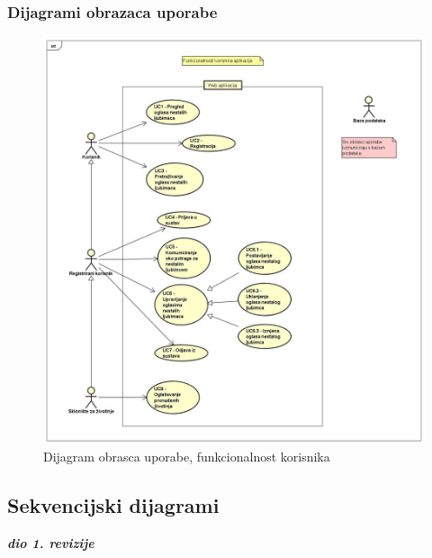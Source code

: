 				
					
				\pagebreak
				\subsubsection{Dijagrami obrazaca uporabe}
				
					\begin{figure}[htb]
						\centering
						\includegraphics[width=\textwidth]{slike/funkcionalnost_korisnika.jpg}
						\caption{Dijagram obrasca uporabe, funkcionalnost korisnika}
					\end{figure}		
				
			\pagebreak
			\subsection{Sekvencijski dijagrami}

				\textbf{\textit{dio 1. revizije}}\\


